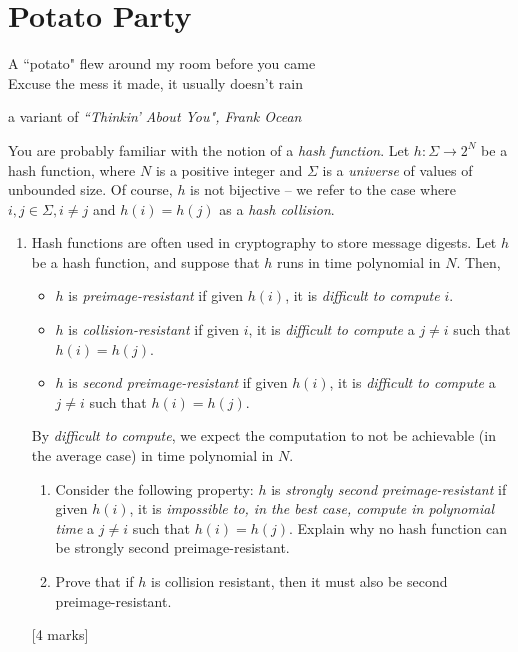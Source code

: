 \documentclass[12pt, a4paper]{article}
\begin{document}
\section{Potato Party}
\epigraph{A ``potato" flew around my room before you came \\
Excuse the mess it made, it usually doesn't rain
}{a variant of \textit{``Thinkin' About You", Frank Ocean}}

\noindent You are probably familiar with the notion of a \textit{hash function}. Let $h : \Sigma \rightarrow 2^N$ be a hash function, where $N$ is a positive integer and $\Sigma$ is a \textit{universe} of values of unbounded size. Of course, $h$ is not bijective -- we refer to the case where $i, j \in \Sigma, i \neq j$ and $h(i) = h(j)$ as a \textit{hash collision}. 
\begin{enumerate}
\item Hash functions are often used in cryptography to store message digests. Let $h$ be a hash function, and suppose that $h$ runs in time polynomial in $N$. Then, 
\begin{itemize}
\item $h$ is \textit{preimage-resistant} if given $h(i)$, it is \textit{difficult to compute} $i$.
\item $h$ is \textit{collision-resistant} if given $i$, it is \textit{difficult to compute} a $j \neq i$ such that $h(i) = h(j)$.
\item $h$ is \textit{second preimage-resistant} if given $h(i)$, it is \textit{difficult to compute} a $j \neq i$ such that $h(i) = h(j)$.
\end{itemize}
By \textit{difficult to compute}, we expect the computation to not be achievable (in the average case) in time polynomial in $N$.
\begin{enumerate}
\item Consider the following property: $h$ is \textit{strongly second preimage-resistant} if given $h(i)$, it is \textit{impossible to, in the best case, compute in polynomial time} a $j \neq i$ such that $h(i) = h(j)$. Explain why no hash function can be strongly second preimage-resistant. %

\item Prove that if $h$ is collision resistant, then it must also be second preimage-resistant. %
\end{enumerate}

[4 marks]


\end{enumerate}
\end{document}
